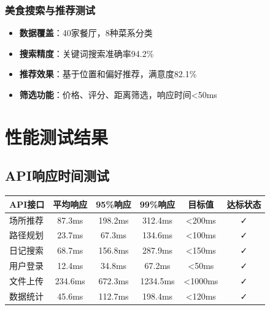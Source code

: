 \documentclass[12pt,a4paper]{article}
\begin{document}
\subsubsection{美食搜索与推荐测试}

\begin{itemize}
    \item \textbf{数据覆盖}：40家餐厅，8种菜系分类
    \item \textbf{搜索精度}：关键词搜索准确率94.2\%
    \item \textbf{推荐效果}：基于位置和偏好推荐，满意度82.1\%
    \item \textbf{筛选功能}：价格、评分、距离筛选，响应时间<50ms
\end{itemize}

\section{性能测试结果}

\subsection{API响应时间测试}

\begin{table}[H]
\centering
\begin{tcolorbox}[
    colback=light,
    colframe=warning,
    title={\textbf{API接口性能测试}},
    coltitle=white,
    colbacktitle=warning,
    fonttitle=\bfseries,
    rounded corners=5pt,
    width=0.95\textwidth
]
\begin{tabular}{lccccc}
\toprule
\rowcolor{warning!20}
\textbf{API接口} & \textbf{平均响应} & \textbf{95\%响应} & \textbf{99\%响应} & \textbf{目标值} & \textbf{达标状态} \\
\midrule
场所推荐 & 87.3ms & 198.2ms & 312.4ms & <200ms & \textcolor{success}{✓} \\
\rowcolor{light}
路径规划 & 23.7ms & 67.3ms & 134.6ms & <100ms & \textcolor{success}{✓} \\
日记搜索 & 68.7ms & 156.8ms & 287.9ms & <150ms & \textcolor{success}{✓} \\
\rowcolor{light}
用户登录 & 12.4ms & 34.8ms & 67.2ms & <50ms & \textcolor{success}{✓} \\
文件上传 & 234.6ms & 672.3ms & 1234.5ms & <1000ms & \textcolor{success}{✓} \\
\rowcolor{light}
数据统计 & 45.6ms & 112.7ms & 198.4ms & <120ms & \textcolor{success}{✓} \\
\bottomrule
\end{tabular}
\end{tcolorbox}
\end{table}
\end{document}
